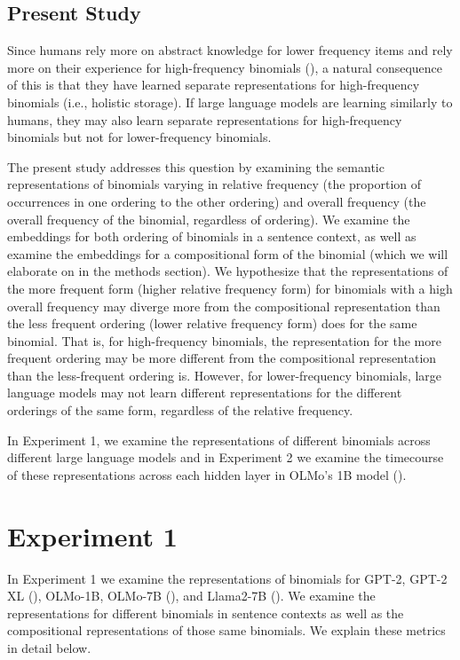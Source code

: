 \documentclass[
  12pt,
  letterpaper,
]{scrreport}
\begin{document}
\subsection{Present Study}\label{present-study-2}

Since humans rely more on abstract knowledge for lower frequency items
and rely more on their experience for high-frequency binomials
(), a natural consequence
of this is that they have learned separate representations for
high-frequency binomials (i.e., holistic storage). If large language
models are learning similarly to humans, they may also learn separate
representations for high-frequency binomials but not for lower-frequency
binomials.

The present study addresses this question by examining the semantic
representations of binomials varying in relative frequency (the
proportion of occurrences in one ordering to the other ordering) and
overall frequency (the overall frequency of the binomial, regardless of
ordering). We examine the embeddings for both ordering of binomials in a
sentence context, as well as examine the embeddings for a compositional
form of the binomial (which we will elaborate on in the methods
section). We hypothesize that the representations of the more frequent
form (higher relative frequency form) for binomials with a high overall
frequency may diverge more from the compositional representation than
the less frequent ordering (lower relative frequency form) does for the
same binomial. That is, for high-frequency binomials, the representation
for the more frequent ordering may be more different from the
compositional representation than the less-frequent ordering is.
However, for lower-frequency binomials, large language models may not
learn different representations for the different orderings of the same
form, regardless of the relative frequency.

In Experiment 1, we examine the representations of different binomials
across different large language models and in Experiment 2 we examine
the timecourse of these representations across each hidden layer in
OLMo's 1B model
().

\section{Experiment 1}\label{experiment-1-2}

In Experiment 1 we examine the representations of binomials for GPT-2,
GPT-2 XL (), OLMo-1B, OLMo-7B
(), and Llama2-7B (). We examine the representations for different binomials in
sentence contexts as well as the compositional representations of those
same binomials. We explain these metrics in detail below.
\end{document}
